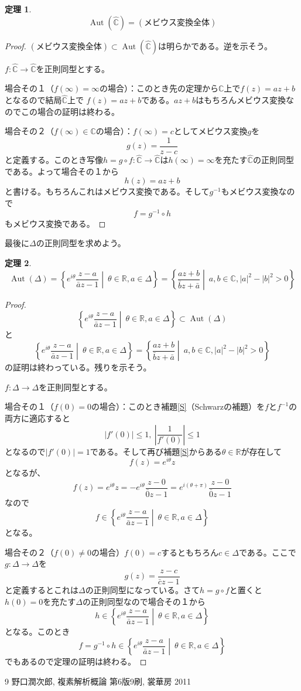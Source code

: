 \documentclass[leqno]{jsarticle}
\newtheorem{thm}{定理}
\newcommand{\rr}{\mathbb{R}}
\newcommand{\cc}{\mathbb{C}}
\DeclareMathOperator{\aut}{Aut}
\begin{document}
\begin{thm}
\[
\aut(\hat{\cc})=(\text{メビウス変換全体})
\]
\end{thm}
\begin{proof}
$(\text{メビウス変換全体})\subset \aut(\hat{\cc})$は明らかである。逆を示そう。\par
$f:\hat{\cc}\to \hat{\cc}$を正則同型とする。\par
場合その１（$f(\infty)=\infty$の場合）：このとき先の定理から$\cc$上で$f(z)=az+b$となるので結局$\hat{\cc}$上で
$f(z)=az+b$である。$az+b$はもちろんメビウス変換なのでこの場合の証明は終わる。\par
場合その２（$f(\infty)\in \cc$の場合）：$f(\infty)=c$としてメビウス変換$g$を
\[
g(z)=\frac{1}{z-c}
\]
と定義する。このとき写像$h=g\circ f:\hat{\cc}\to \hat{\cc}$は$h(\infty)=\infty$を充たす$\hat{\cc}$の正則同型である。よって場合その１から
\[
h(z)=az+b
\]
と書ける。もちろんこれはメビウス変換である。そして$g^{-1}$もメビウス変換なので
\[
f=g^{-1}\circ h
\]
もメビウス変換である。
\end{proof}

最後に$\Delta$の正則同型を求めよう。
\begin{thm}
\[
\aut(\Delta)=\left\{e^{i\theta}\frac{z-a}{\bar{a}z-1}\middle|\ \theta\in \rr, a\in \Delta \right\}=
\left\{\frac{az+b}{\bar{b}z+\bar{a}}\middle| \ a,b\in \cc, |a|^2-|b|^2>0\right\}
\]
\end{thm}
\begin{proof}
\[
\left\{e^{i\theta}\frac{z-a}{\bar{a}z-1}\middle|\ \theta\in \rr, a\in \Delta \right\}\subset \aut(\Delta)
\]
と
\[
\left\{e^{i\theta}\frac{z-a}{\bar{a}z-1}\middle|\ \theta\in \rr, a\in \Delta \right\}=
\left\{\frac{az+b}{\bar{b}z+\bar{a}}\middle| \ a,b\in \cc, |a|^2-|b|^2>0\right\}
\]
の証明は終わっている。残りを示そう。\par
$f:\Delta\to \Delta$を正則同型とする。\par
場合その１（$f(0)=0$の場合）：このとき補題\ref{S}（Schwarzの補題）を$f$と$f^{-1}$の両方に適応すると
\[
|f'(0)|\le 1,\ \left|\frac{1}{f'(0)}\right|\le 1
\]
となるので$|f'(0)|=1$である。そして再び補題\ref{S}からある$\theta\in \rr$が存在して
\[
f(z)=e^{i\theta}z
\]
となるが、
\[
f(z)=e^{i\theta}z=-e^{i\theta}\frac{z-0}{\bar{0}z-1}=e^{i(\theta+\pi)}\frac{z-0}{\bar{0}z-1}
\]
なので
\[
f\in \left\{e^{i\theta}\frac{z-a}{\bar{a}z-1}\middle|\ \theta\in \rr, a\in \Delta \right\}
\]
となる。\par
場合その２（$f(0)\neq 0$の場合）$f(0)=c$するともちろん$c\in \Delta$である。ここで$g:\Delta\to \Delta$を
\[
g(z)=\frac{z-c}{\bar{c}z-1}
\]
と定義するとこれは$\Delta$の正則同型になっている。さて$h=g\circ f$と置くと$h(0)=0$を充たす$\Delta$の正則同型なので場合その１から
\[
h\in \left\{e^{i\theta}\frac{z-a}{\bar{a}z-1}\middle|\ \theta\in \rr, a\in \Delta \right\}
\]
となる。このとき
\[
f=g^{-1}\circ h\in \left\{e^{i\theta}\frac{z-a}{\bar{a}z-1}\middle|\ \theta\in \rr, a\in \Delta \right\}
\]
でもあるので定理の証明は終わる。
\end{proof}














	
\begin{thebibliography}{9}
野口潤次郎, 複素解析概論  第6版9刷, 裳華房 2011
\end{thebibliography}




			
\end{document}
